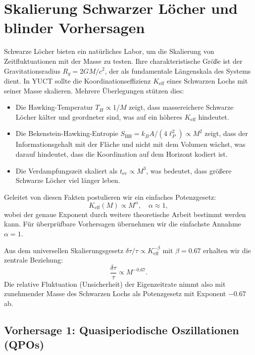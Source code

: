 \documentclass[12pt,a4paper]{article}
\newcommand{\Keff}{K_{\mathrm{eff}}}
\begin{document}
	\section{Skalierung Schwarzer Löcher und blinder Vorhersagen}
	\label{sec:blackhole}
	
	Schwarze Löcher bieten ein natürliches Labor, um die Skalierung von Zeitfluktuationen mit der Masse zu testen. Ihre charakteristische Größe ist der Gravitationsradius \(R_g = 2GM/c^2\), der als fundamentale Längenskala des Systems dient. In YUCT sollte die Koordinationseffizienz \(\Keff\) eines Schwarzen Lochs mit seiner Masse skalieren. Mehrere Überlegungen stützen dies:
	\begin{itemize}
		\item Die Hawking-Temperatur \(T_H \propto 1/M\) zeigt, dass massereichere Schwarze Löcher kälter und geordneter sind, was auf ein höheres \(\Keff\) hindeutet.
		\item Die Bekenstein-Hawking-Entropie \(S_{\text{BH}} = k_B A/(4\ell_P^2) \propto M^2\) zeigt, dass der Informationsgehalt mit der Fläche und nicht mit dem Volumen wächst, was darauf hindeutet, dass die Koordination auf dem Horizont kodiert ist.
		\item Die Verdampfungszeit skaliert als \(t_{\text{ev}} \propto M^3\), was bedeutet, dass größere Schwarze Löcher viel länger leben.
	\end{itemize}
	Geleitet von diesen Fakten postulieren wir ein einfaches Potenzgesetz:
	\begin{equation}
		\Keff(M) \propto M^{\alpha}, \quad \alpha \approx 1,
	\end{equation}
	wobei der genaue Exponent durch weitere theoretische Arbeit bestimmt werden kann. Für überprüfbare Vorhersagen übernehmen wir die einfachste Annahme \(\alpha = 1\).
	
	Aus dem universellen Skalierungsgesetz \(\delta \tau / \tau \propto \Keff^{-\beta}\) mit \(\beta = 0.67\) erhalten wir die zentrale Beziehung:
	\begin{equation}
		\boxed{\frac{\delta \tau}{\tau} \propto M^{-0.67}}.
	\end{equation}
	Die relative Fluktuation (Unsicherheit) der Eigenzeitrate nimmt also mit zunehmender Masse des Schwarzen Lochs als Potenzgesetz mit Exponent \(-0.67\) ab.
	
	\subsection{Vorhersage 1: Quasiperiodische Oszillationen (QPOs)}
	
\end{document}
